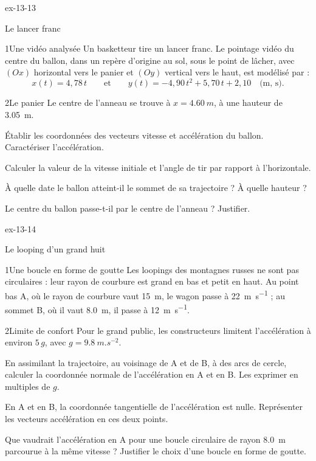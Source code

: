 \begin{blocLivre}{ex-13-13}
\begin{exercice}[3]{Le lancer franc}
\begin{docu}{1}{Une vidéo analysée}
Un basketteur tire un lancer franc. Le pointage vidéo du centre du ballon, dans un repère d'origine au sol, sous le
point de lâcher, avec $(Ox)$ horizontal vers le panier et $(Oy)$ vertical vers le haut, est modélisé par :
\[x(t)=4{,}78\,t\qquad\text{et}\qquad y(t)=-4{,}90\,t^2+5{,}70\,t+2{,}10\quad\text{(m, s)}.\]
\end{docu}
\begin{docu}{2}{Le panier}
Le centre de l'anneau se trouve à $x=\qty{4,60}{m}$, à une hauteur de \qty{3,05}{m}.
\end{docu}
\begin{questions}
\item Établir les coordonnées des vecteurs vitesse et accélération du ballon. Caractériser l'accélération.
\item Calculer la valeur de la vitesse initiale et l'angle de tir par rapport à l'horizontale.
\item À quelle date le ballon atteint-il le sommet de sa trajectoire ? À quelle hauteur ?
\item \initiative Le centre du ballon passe-t-il par le centre de l'anneau ? Justifier.
\end{questions}
\end{exercice}
\end{blocLivre}
\begin{blocLivre}{ex-13-14}
\begin{exercice}[3]{Le looping d'un grand huit}
\begin{docu}{1}{Une boucle en forme de goutte}
Les loopings des montagnes russes ne sont pas circulaires : leur rayon de courbure est grand en bas et petit en haut.
Au point bas A, où le rayon de courbure vaut \qty{15}{m}, le wagon passe à \qty{22}{m.s^{-1}} ; au sommet B, où il vaut
\qty{8,0}{m}, il passe à \qty{12}{m.s^{-1}}.
\end{docu}
\begin{docu}{2}{Limite de confort}
Pour le grand public, les constructeurs limitent l'accélération à environ $5\,g$, avec $g=\qty{9,8}{m.s^{-2}}$.
\end{docu}
\begin{questions}
\item En assimilant la trajectoire, au voisinage de A et de B, à des arcs de cercle, calculer la coordonnée normale de
l'accélération en A et en B. Les exprimer en multiples de $g$.
\item En A et en B, la coordonnée tangentielle de l'accélération est nulle. Représenter les vecteurs accélération en ces
deux points.
\item \initiative Que vaudrait l'accélération en A pour une boucle circulaire de rayon \qty{8,0}{m} parcourue à la même
vitesse ? Justifier le choix d'une boucle en forme de goutte.
\end{questions}
\end{exercice}
\end{blocLivre}
